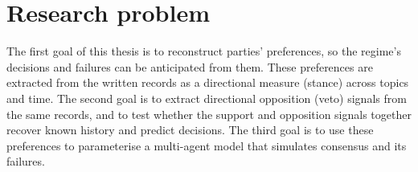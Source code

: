 \section{Research problem}
\label{sec:rqs}
The first goal of this thesis is to reconstruct parties' preferences, so the regime's decisions
and failures can be anticipated from them. These preferences are extracted from the written
records as a directional measure (stance) across topics and time. The second goal is to extract
 directional opposition (veto) signals from the same records, and to test whether the support and
opposition signals together recover known history and predict decisions. The third goal is to use these preferences
to parameterise a multi-agent model that simulates consensus and its failures.


